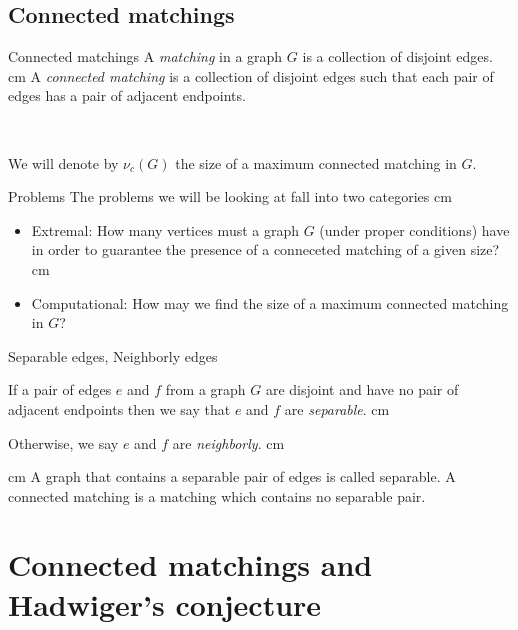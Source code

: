 \documentclass{beamer}
\newcommand{\bframe}[2]{\begin{frame}{#1}#2\end{frame}}
\begin{document}
\subsection{Connected matchings}

\bframe{Connected matchings}{
 A {\it matching} in a graph $G$ is a collection of disjoint edges. \pause\vskip 0.5 cm
 A \textit{connected matching} is a collection of disjoint edges such that each pair of edges has a pair of adjacent endpoints. \pause
	\begin{center}
	\begin{overprint}
		\onslide<2>\\
		\onslide<3-> \qquad
	\end{overprint}
	\end{center}\pause
We will denote by $\nu_c(G)$ the size of a maximum connected matching in $G$.
}

\bframe{Problems}{
The problems we will be looking at fall into two categories\pause\vskip 0.5 cm 
\begin{itemize}
	\item Extremal: How many vertices must a graph $G$ (under proper conditions) have in order to guarantee the presence of a conneceted matching of a given size?\pause\vskip 0.5 cm 
	\item Computational: How may we find the size of a maximum connected matching in $G$?
\end{itemize}
}

\bframe{Separable edges, Neighborly edges}{

If a pair of edges $e $ and $f$ from a graph $G$ are disjoint and have no pair of adjacent endpoints then we say that $e$ and $f$ are {\it separable}. \pause\vskip 0.5 cm

Otherwise, we say $e$ and $f$ are {\it neighborly}. \pause\vskip 0.5 cm
\begin{center}
	\qquad\pause
	\qquad\pause
	 \pause
\end{center}
\vskip 0.5 cm
A graph that contains a separable pair of edges is called separable.  \pause A connected matching is a matching which contains no separable pair.

}


\section{Connected matchings and Hadwiger's conjecture}
\end{document}
